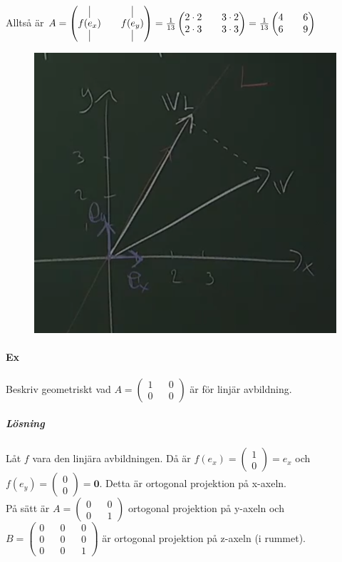 Alltså är $A=\begin{pmatrix}
    \vline&&\vline\\
    f(e_{x})&&f(e_{y})\\
    \vline&&\vline
\end{pmatrix}=\frac{1}{13}\begin{pmatrix}
    2\cdot 2&&3\cdot 2\\
    2\cdot 3&&3\cdot 3
\end{pmatrix}=\frac{1}{13}\begin{pmatrix}4&&6\\6&&9\end{pmatrix}$
\begin{figure}[h]
    \includegraphics[scale=0.4]{imgs/img02.png}
\end{figure}

\paragraph{Ex} Beskriv geometriskt vad $A=\begin{pmatrix}1&&0\\0&&0\end{pmatrix}$ är för linjär avbildning.
\subparagraph{Lösning} Låt $f$ vara den linjära avbildningen.
Då är $f(e_{x})=\begin{pmatrix}1\\0\end{pmatrix}=e_{x}$ och $f(e_{y})=\begin{pmatrix}0\\0\end{pmatrix}=\bm{0}$.
Detta är ortogonal projektion på x-axeln.\\
På sätt är $A=\begin{pmatrix}0&&0\\0&&1\end{pmatrix}$ ortogonal projektion på y-axeln och 
$B=\begin{pmatrix}0&&0&&0\\0&&0&&0\\0&&0&&1\end{pmatrix}$ är ortogonal projektion på z-axeln (i rummet).

